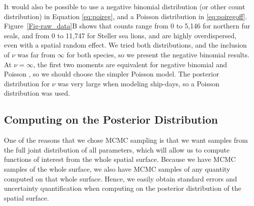 \documentclass[11pt, titlepage]{article}
\begin{document}
\begin{spacing}{1.9}
\begin{flushleft}
It would also be possible to use a negative binomial distribution (or other count distribution) in Equation \eqref{eq:poireg}, and a Poisson distribution in  \eqref{eq:poiregoff}. Figure~\ref{Fig-raw_data}B shows that counts range from 0 to 5,146 for northern fur seals, and from 0 to 11,747 for Steller sea lions, and are highly overdispersed, even with a spatial random effect.  We tried both distributions, and the inclusion of $\nu$ was far from $\infty$ for both species, so we present the negative binomial results. At $\nu = \infty$, the first two moments are equivalent for negative binomial and Poisson \citep{VerHoefEtAl2007QuasiPoissonvsnegative2766}, so we should choose the simpler Poisson model.  The posterior distribution for $\nu$ was very large when modeling ship-days, so a Poisson distribution was used.


\subsection{Computing on the Posterior Distribution}

One of the reasons that we chose MCMC sampling is that we want samples from the full joint distribution of all parameters, which will allow us to compute functions of interest from the whole spatial surface.  Because we have MCMC samples of the whole surface, we also have MCMC samples of any quantity computed on that whole surface.  Hence, we easily obtain standard errors and uncertainty quantification when computing on the posterior distribution of the spatial surface.


\end{flushleft}
\end{spacing}
\end{document}
